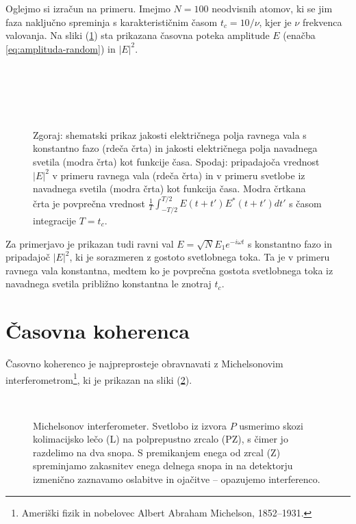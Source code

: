 Oglejmo si izračun
na primeru. Imejmo $N=100$ neodvisnih atomov, ki se jim faza naključno
spreminja s karakterističnim časom $t_{c}=10/\nu$, kjer je $\nu$
frekvenca valovanja. Na sliki (\ref{fig:amplituda-intenziteta}) sta
prikazana časovna poteka amplitude $E$ (enačba \ref{eq:amplituda-random})
in $|E|^{2}$.
\begin{figure}
\centering
\def\svgwidth{140truemm} 
\\
\def\svgwidth{140truemm} 
\\
\def\svgwidth{140truemm} 
\\
\def\svgwidth{140truemm} 
\\
\caption{Zgoraj: shematski prikaz jakosti električnega polja 
ravnega vala s konstantno fazo (rdeča črta) in jakosti električnega
polja navadnega svetila (modra črta) kot funkcije časa. 
Spodaj: pripadajoča vrednost $|E|^2$ v primeru ravnega vala (rdeča črta) in 
v primeru svetlobe iz navadnega svetila (modra črta) kot funkcija
časa. Modra črtkana črta je povprečna vrednost
$\frac{1}{T}\int_{-T/2}^{T/2}E(t+t')E^{*}(t+t')dt'$
s časom integracije $T=t_{c}$.}
\label{fig:amplituda-intenziteta}
\end{figure}
Za primerjavo je prikazan tudi ravni val $E=\sqrt{N}E_{1}e^{-i\omega t}$
s konstantno fazo in pripadajoč $|E|^{2}$, ki je sorazmeren z gostoto svetlobnega
toka. Ta je v primeru ravnega vala konstantna, medtem ko je povprečna gostota
svetlobnega toka iz navadnega svetila približno konstantna le znotraj $t_{c}$.

\section{Časovna koherenca}
\label{sec:casovna-koherenca}

Časovno koherenco je najpreprosteje obravnavati 
z Michelsonovim 
interferometrom\footnote{Ameriški fizik in nobelovec Albert Abraham Michelson, 1852--1931.},
ki je prikazan na sliki (\ref{fig:michelson}). 
\begin{figure}[!h]
\centering
\def\svgwidth{85truemm} 
\\
\caption{\label{fig:michelson}Michelsonov interferometer. Svetlobo
iz izvora $P$ usmerimo skozi kolimacijsko lečo (L) na polprepustno
zrcalo (PZ), s čimer jo razdelimo na dva snopa. S premikanjem 
enega od zrcal (Z) spreminjamo zakasnitev enega delnega snopa in
na detektorju izmenično zaznavamo oslabitve in ojačitve -- opazujemo interferenco.}
\end{figure}

